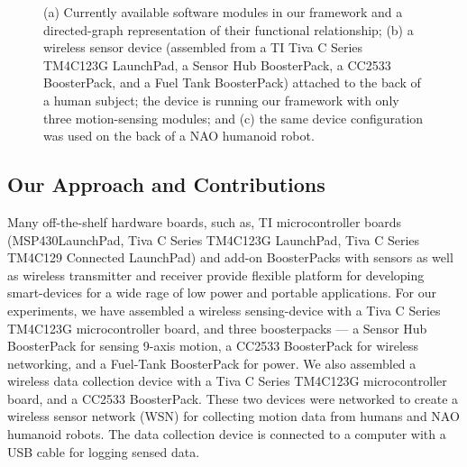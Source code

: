 \documentclass[letterpaper]{article}
\begin{document}
\begin{sloppy}
\begin{figure}[!t]
\centering
{}
\caption{(a) Currently available software modules in our framework and a directed-graph representation of their functional relationship;  (b) a wireless sensor device (assembled from a TI Tiva C Series  TM4C123G LaunchPad, a Sensor Hub BoosterPack, a CC2533 BoosterPack, and a Fuel Tank BoosterPack) attached to the back of a human subject; the device is running our framework  with only three motion-sensing modules; and (c) the 
same device configuration was used on the back of a NAO humanoid robot.}
 \label{fig:framework}
\end{figure}

\subsection{Our Approach and Contributions}

Many off-the-shelf hardware boards, such as, TI microcontroller boards (MSP430{\texttrademark}LaunchPad, Tiva{\texttrademark} C Series 
TM4C123G LaunchPad, Tiva C Series TM4C129 Connected LaunchPad) and add-on  BoosterPacks   with sensors as well as  wireless transmitter and receiver  provide flexible platform for 
developing smart-devices for a wide rage of low power and portable applications. For our experiments, 
we have assembled a wireless sensing-device with a Tiva C Series TM4C123G microcontroller board, and three 
boosterpacks --- a
Sensor Hub BoosterPack  for sensing 9-axis motion,  a CC2533  BoosterPack for wireless 
networking, and a Fuel-Tank BoosterPack for power. We also assembled a wireless data collection device with a Tiva C Series TM4C123G microcontroller board, and a  CC2533  BoosterPack. These two devices were networked to create a wireless sensor network (WSN) for 
collecting motion data from  humans and NAO humanoid robots. The data collection device is connected to a computer with a USB cable for logging sensed data.   


\end{sloppy}
\end{document}
